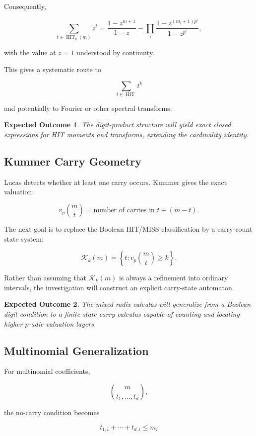 \documentclass[11pt]{article}
\newtheorem{expectation}{Expected Outcome}
\begin{document}
Consequently,

$$
\sum_{t\in\operatorname{HIT}_p(m)}z^t
=
\frac{1-z^{m+1}}{1-z}
-
\prod_i
\frac{1-z^{(m_i+1)p^i}}
     {1-z^{p^i}},
$$

with the value at $z=1$ understood by continuity.

This gives a systematic route to

$$
\sum_{t\in\operatorname{HIT}}t^k
$$

and potentially to Fourier or other spectral transforms.

\begin{expectation}
The digit-product structure will yield exact closed expressions for HIT moments and transforms, extending the cardinality identity.
\end{expectation}

\subsection{Kummer Carry Geometry}

Lucas detects whether at least one carry occurs. Kummer gives the exact valuation:

$$
v_p\binom{m}{t}
=
\text{number of carries in }t+(m-t).
$$

The next goal is to replace the Boolean HIT/MISS classification by a carry-count state system:

$$
\mathcal{K}_k(m)
=
\left\{
t:
v_p\binom{m}{t}\geq k
\right\}.
$$

Rather than assuming that $\mathcal{K}_k(m)$ is always a refinement into ordinary intervals, the investigation will construct an explicit carry-state automaton.

\begin{expectation}
The mixed-radix calculus will generalize from a Boolean digit condition to a finite-state carry calculus capable of counting and locating higher $p$-adic valuation layers.
\end{expectation}

\subsection{Multinomial Generalization}

For multinomial coefficients,

$$
\binom{m}{t_1,\ldots,t_d},
$$

the no-carry condition becomes

$$
t_{1,i}+\cdots+t_{d,i}\leq m_i
$$
\end{document}
